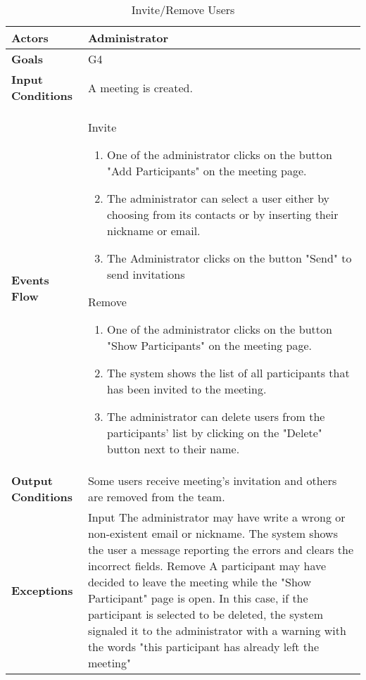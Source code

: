 \begin{table}[H]
	\centering
	\def\arraystretch{1.5}
	\begin{tabular}{|p{7cm}|p{7cm}|}
		\hline
		\textbf{Actors}            & Administrator    \\ \hline
		\textbf{Goals}             & G4           \\ \hline
		\textbf{Input Conditions}  & A meeting is created.           \\ \hline
		\textbf{Events Flow}       & Invite 
		\begin{enumerate}[topsep=0pt, leftmargin=*]
			\item One of the administrator clicks on the button "Add Participants" on the meeting page.
			\item The administrator can select a user either by choosing from its contacts or by inserting their nickname or email.
			\item The Administrator clicks on the button "Send" to send invitations
		\end{enumerate}   
		Remove 
		\begin{enumerate}[topsep=0pt, leftmargin=*]
			\item One of the administrator clicks on the button "Show Participants" on the meeting page.
			\item The system shows the list of all participants that has been invited to the meeting.
			\item The administrator can delete users from the participants' list by clicking on the "Delete" button next to their name.
		\end{enumerate}            \\ \hline
		\textbf{Output Conditions} & Some users receive meeting's invitation and others are removed from the team.            \\ \hline
		\textbf{Exceptions}        & Input \newline
		The administrator may have write a wrong or non-existent email or nickname. The system shows the user a message reporting the errors and
		clears the incorrect fields. \newline
		Remove \newline
		A participant may have decided to leave the meeting while the "Show Participant" page is open. In this case, if the participant is selected to be deleted, the system signaled it to the administrator with a warning with the words "this participant has already left the meeting"         \\ \hline
	\end{tabular}
	\caption{Invite/Remove Users}
\end{table}

